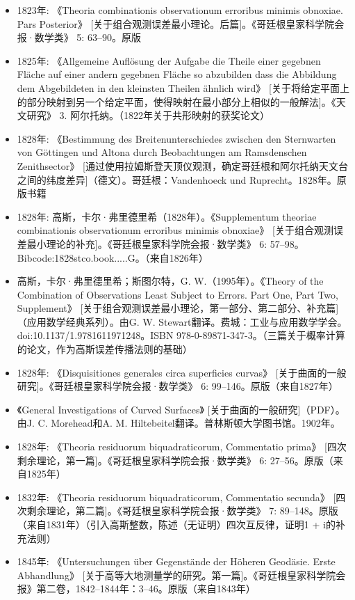 \begin{itemize}
\item 1823年: 《Theoria combinationis observationum erroribus minimis obnoxiae. Pars Posterior》 [关于组合观测误差最小理论。后篇]。《哥廷根皇家科学院会报·数学类》 5: 63–90。原版
\item 1825年: 《Allgemeine Auflösung der Aufgabe die Theile einer gegebnen Fläche auf einer andern gegebnen Fläche so abzubilden dass die Abbildung dem Abgebildeten in den kleinsten Theilen ähnlich wird》 [关于将给定平面上的部分映射到另一个给定平面，使得映射在最小部分上相似的一般解法]。《天文研究》 3. 阿尔托纳。（1822年关于共形映射的获奖论文）
\item 1828年: 《Bestimmung des Breitenunterschiedes zwischen den Sternwarten von Göttingen und Altona durch Beobachtungen am Ramsdenschen Zenithsector》 [通过使用拉姆斯登天顶仪观测，确定哥廷根和阿尔托纳天文台之间的纬度差异]（德文）。哥廷根：Vandenhoeck und Ruprecht。1828年。原版书籍
\item 1828年: 高斯，卡尔·弗里德里希（1828年）。《Supplementum theoriae combinationis observationum erroribus minimis obnoxiae》 [关于组合观测误差最小理论的补充]。《哥廷根皇家科学院会报·数学类》 6: 57–98。Bibcode:1828stco.book.....G。（来自1826年）
\item 高斯，卡尔·弗里德里希；斯图尔特，G. W.（1995年）。《Theory of the Combination of Observations Least Subject to Errors. Part One, Part Two, Supplement》 [关于组合观测误差最小理论，第一部分、第二部分、补充篇]（应用数学经典系列）。由G. W. Stewart翻译。费城：工业与应用数学学会。doi:10.1137/1.9781611971248。ISBN 978-0-89871-347-3。（三篇关于概率计算的论文，作为高斯误差传播法则的基础）
\item 1828年: 《Disquisitiones generales circa superficies curvas》 [关于曲面的一般研究]。《哥廷根皇家科学院会报·数学类》 6: 99–146。原版（来自1827年）
\item 《General Investigations of Curved Surfaces》 [关于曲面的一般研究]（PDF）。由J. C. Morehead和A. M. Hiltebeitel翻译。普林斯顿大学图书馆。1902年。
\item 1828年: 《Theoria residuorum biquadraticorum, Commentatio prima》 [四次剩余理论，第一篇]。《哥廷根皇家科学院会报·数学类》 6: 27–56。原版（来自1825年）
\item 1832年: 《Theoria residuorum biquadraticorum, Commentatio secunda》 [四次剩余理论，第二篇]。《哥廷根皇家科学院会报·数学类》 7: 89–148。原版（来自1831年）（引入高斯整数，陈述（无证明）四次互反律，证明1 + i的补充法则）
\item 1845年: 《Untersuchungen über Gegenstände der Höheren Geodäsie. Erste Abhandlung》 [关于高等大地测量学的研究。第一篇]。《哥廷根皇家科学院会报》第二卷，1842–1844年：3–46。原版（来自1843年）

\end{itemize}
